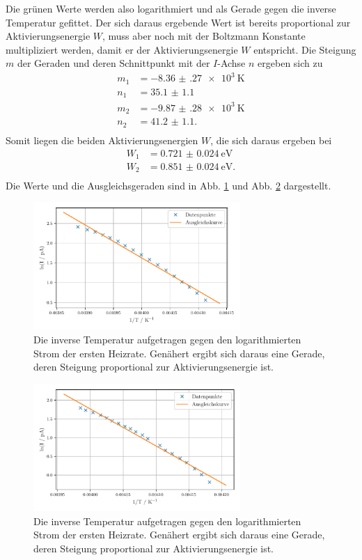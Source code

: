 Die grünen Werte werden also logarithmiert und als Gerade gegen die inverse Temperatur gefittet. Der sich daraus ergebende Wert ist bereits proportional zur Aktivierungsenergie $W$, muss aber noch mit der Boltzmann Konstante multipliziert werden, damit er der Aktivierungsenergie $W$ entspricht. Die Steigung $m$ der Geraden und deren Schnittpunkt mit der $I$-Achse $n$ ergeben sich zu 
\begin{align*}
     m_{1} &= \SI{-8.36(27)e3}{\kelvin} \\
     n_{1} &= \num{35.1(11)} \\
     m_{2} &= \SI{-9.87(28)e3}{\kelvin} \\
     n_{2} &= \num{41.2(11)}. \\
\end{align*}
Somit liegen die beiden Aktivierungsenergien $W$, die sich daraus ergeben bei 
\begin{align*}
    W_{1} &= \SI{0.721(24)}{\electronvolt} \\
    W_{2} &= \SI{0.851(24)}{\electronvolt}. \\
\end{align*}
Die Werte und die Ausgleichsgeraden sind in Abb. \ref{abb:anlauf1} und Abb. \ref{abb:anlauf2} dargestellt. 

\begin{figure}
    \centering
    \includegraphics[width=0.7\textwidth]{figures/anlauf1.pdf}
    \caption{Die inverse Temperatur aufgetragen gegen den logarithmierten Strom der ersten Heizrate. Genähert ergibt sich daraus eine Gerade, deren Steigung proportional zur Aktivierungsenergie ist.}
    \label{abb:anlauf1}
\end{figure}

\begin{figure}
    \centering
    \includegraphics[width=0.7\textwidth]{figures/anlauf2.pdf}
    \caption{Die inverse Temperatur aufgetragen gegen den logarithmierten Strom der ersten Heizrate. Genähert ergibt sich daraus eine Gerade, deren Steigung proportional zur Aktivierungsenergie ist.}
    \label{abb:anlauf2}
\end{figure}

